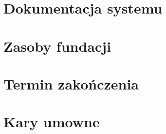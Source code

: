 \documentclass{article}
\begin{document}
\section{Dokumentacja systemu}
\section{Zasoby fundacji}

\section{Termin zakończenia}

\section{Kary umowne}
\end{document}
